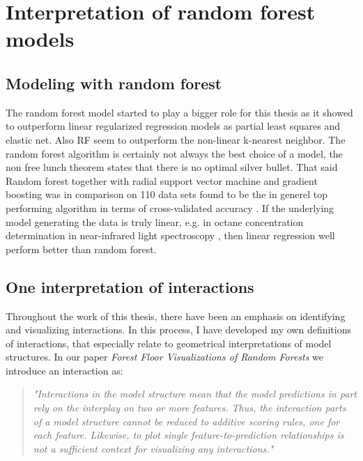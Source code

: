 \chapter{Interpretation of random forest models}

\section{Modeling with random forest}
The random forest model started to play a bigger role for this thesis as it showed to outperform linear regularized regression models as partial least squares and elastic net. Also RF seem to outperform the non-linear k-nearest neighbor. The random forest algorithm is certainly not always the best choice of a model, the non free lunch theorem states that there is no optimal silver bullet. That said Random forest together with radial support vector machine and gradient boosting was in comparison on 110 data sets found to be the in generel top performing algorithm in terms of cross-validated accuracy \cite{wainer2016comparison}. If the underlying model generating the data is truly linear, e.g. in octane concentration determination in near-infrared light spectroscopy \cite{kalivas1997two}, then linear regression well perform better than random forest.


\section{One interpretation of interactions}
\label{defineInteractions}
Throughout the work of this thesis, there have been an emphasis on identifying and visualizing interactions. In this process, I have developed my own definitions of interactions, that especially relate to geometrical interpretations of model structures. In our paper \textit{Forest Floor Visualizations of Random Forests} we introduce an interaction as:

\begin{quotation}
\textit{
"Interactions in the model structure mean that the model predictions in part rely on the interplay on two or more features. Thus, the interaction parts of a model structure cannot be reduced to additive scoring rules, one for each feature. Likewise, to plot single feature-to-prediction relationships is not a sufficient context for visualizing any interactions."
}
\cite{welling2016forest}
\end{quotation}

